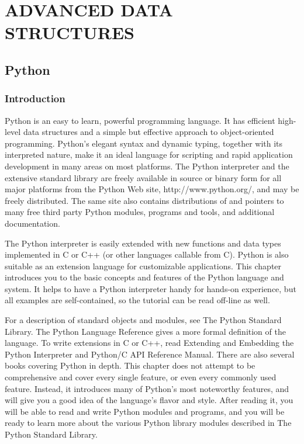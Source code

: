 \documentclass[12pt,a4paper,final,twoside,titlepage]{book}
\begin{document}
\part{ADVANCED DATA STRUCTURES}

\chapter{Python}
\section{Introduction}
Python is an easy to learn, powerful programming language. It has efficient high-level data structures and a simple but effective approach to object-oriented programming. Python’s elegant syntax and dynamic typing, together with its interpreted nature, make it an ideal language for scripting and rapid application development in many areas on most platforms. The Python interpreter and the extensive standard library are freely available in source or binary form for all major platforms from the Python Web site, http://www.python.org/, and may be freely distributed. The same site also contains distributions of and pointers to many free third party Python modules, programs and tools, and additional documentation.

The Python interpreter is easily extended with new functions and data types implemented in C or C++ (or other languages callable from C). Python is also suitable as an extension language for customizable applications. This chapter introduces you to the basic concepts and features of the Python language and system. It helps to have a Python interpreter handy for hands-on experience, but all examples are self-contained, so the tutorial can be read off-line as well.

For a description of standard objects and modules, see The Python Standard Library. The Python Language Reference gives a more formal definition of the language. To write extensions in C or C++, read Extending and Embedding the Python Interpreter and Python/C API Reference Manual. There are also several books covering Python in depth. This chapter does not attempt to be comprehensive and cover every single feature, or even every commonly used feature. Instead, it introduces many of Python’s most noteworthy features, and will give you a good idea of the language’s flavor and style. After reading it, you will be able to read and write Python modules and programs, and you will be ready to learn more about the various Python library modules described in The Python Standard Library.
\end{document}
